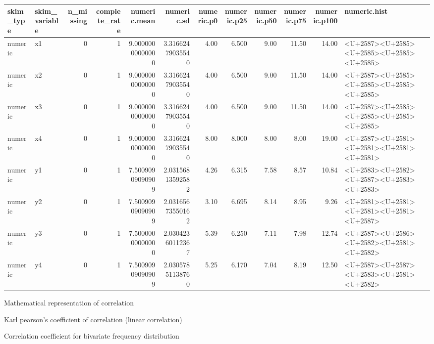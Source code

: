 \documentclass[
  ignorenonframetext,
  aspectratio=169]{beamer}
\begin{document}
\begin{frame}{}
\protect\hypertarget{section-2}{}
\begin{tabular}{llrrrrrrrrrl}
\toprule
skim\_type & skim\_variable & n\_missing & complete\_rate & numeric.mean & numeric.sd & numeric.p0 & numeric.p25 & numeric.p50 & numeric.p75 & numeric.p100 & numeric.hist\\
\midrule
numeric & x1 & 0 & 1 & 9.00000000000000 & 3.31662479035540 & 4.00 & 6.500 & 9.00 & 11.50 & 14.00 & <U+2587><U+2585><U+2585><U+2585><U+2585>\\
numeric & x2 & 0 & 1 & 9.00000000000000 & 3.31662479035540 & 4.00 & 6.500 & 9.00 & 11.50 & 14.00 & <U+2587><U+2585><U+2585><U+2585><U+2585>\\
numeric & x3 & 0 & 1 & 9.00000000000000 & 3.31662479035540 & 4.00 & 6.500 & 9.00 & 11.50 & 14.00 & <U+2587><U+2585><U+2585><U+2585><U+2585>\\
numeric & x4 & 0 & 1 & 9.00000000000000 & 3.31662479035540 & 8.00 & 8.000 & 8.00 & 8.00 & 19.00 & <U+2587><U+2581><U+2581><U+2581><U+2581>\\
numeric & y1 & 0 & 1 & 7.50090909090909 & 2.03156813592582 & 4.26 & 6.315 & 7.58 & 8.57 & 10.84 & <U+2583><U+2582><U+2587><U+2583><U+2583>\\
\addlinespace
numeric & y2 & 0 & 1 & 7.50090909090909 & 2.03165673550162 & 3.10 & 6.695 & 8.14 & 8.95 & 9.26 & <U+2581><U+2581><U+2581><U+2581><U+2587>\\
numeric & y3 & 0 & 1 & 7.50000000000000 & 2.03042360112367 & 5.39 & 6.250 & 7.11 & 7.98 & 12.74 & <U+2587><U+2586><U+2582><U+2581><U+2582>\\
numeric & y4 & 0 & 1 & 7.50090909090909 & 2.03057851138760 & 5.25 & 6.170 & 7.04 & 8.19 & 12.50 & <U+2587><U+2587><U+2583><U+2581><U+2582>\\
\bottomrule
\end{tabular}
\end{frame}

\begin{frame}{Mathematical representation of correlation}
\protect\hypertarget{mathematical-representation-of-correlation}{}
\end{frame}

\begin{frame}{Karl pearson's coefficient of correlation (linear
correlation)}
\protect\hypertarget{karl-pearsons-coefficient-of-correlation-linear-correlation}{}
\end{frame}

\begin{frame}{Correlation coefficient for bivariate frequency
distribution}
\protect\hypertarget{correlation-coefficient-for-bivariate-frequency-distribution}{}
\end{frame}
\end{document}
